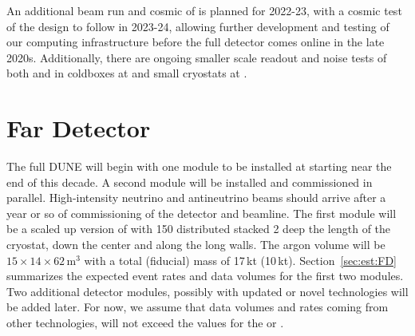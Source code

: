 \documentclass[../main-v1.tex]{subfiles}
\begin{document}
An additional beam run and cosmic of  is planned for 2022-23, with a cosmic test of the  design to follow in 2023-24, allowing further development and testing of our computing infrastructure before the full detector comes online in the late 2020s. Additionally, there are ongoing smaller scale readout and noise tests of both  and  in coldboxes at  and small cryostats at .


\section{Far Detector %
}
\label{sec:intro-fd}

The full DUNE  will begin with one  module to be installed  at  %
starting near the end of  this decade.  A second  module will be installed and commissioned in parallel.  High-intensity neutrino and antineutrino beams should arrive after a year or so of commissioning of the detector and  beamline.  The first %
module will %
be a scaled up version of  with 150  distributed stacked 2  deep %
the length of the cryostat, down the center and along the long walls. %
The argon volume will be $15\times14\times62$\,m$^3$ with a total (fiducial) mass of 17\,kt (10\,kt).  Section~\ref{sec:est:FD} summarizes the expected event rates and data volumes for the first two modules.  Two additional detector modules, possibly with updated or novel technologies %
will be added later. For now, we assume that data volumes and rates coming from other technologies, will not exceed %
the values for the  or .


\end{document}
